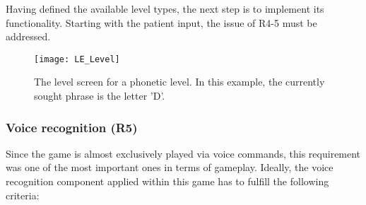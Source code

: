 \documentclass[draft,final]{vutinfth} %
\begin{document}
Having defined the available level types, the next step is to implement its functionality. Starting with the patient input, the issue of R4-5 must be addressed.

\begin{figure}
\begin{center}
\texttt{[image: LE\_Level]}
\end{center}
\caption{The level screen for a phonetic level. In this example, the currently sought phrase is the letter 'D'.}
\label{fig:UseCase}
\end{figure}
\subsubsection{Voice recognition (R5)}
Since the game is almost exclusively played via voice commands, this requirement was one of the most important ones in terms of gameplay. Ideally, the voice recognition component applied within this game has to fulfill the following criteria:
\end{document}

